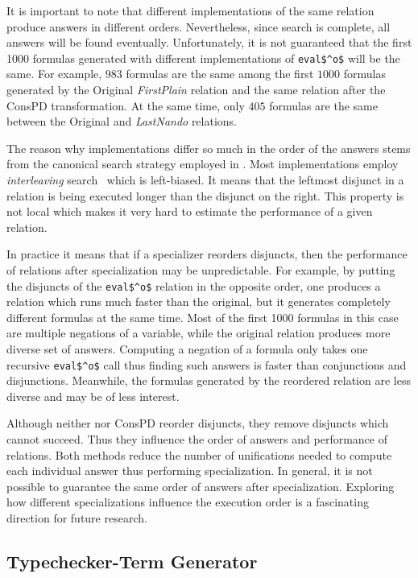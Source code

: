 It is important to note that different implementations of the same \mk relation produce answers in different orders.
Nevertheless, since \mk search is complete, all answers will be found eventually.
Unfortunately, it is not guaranteed that the first 1000 formulas generated with different implementations of \lstinline{eval$^o$} will be the same.
For example, $983$ formulas are the same among the first $1000$ formulas generated by the Original \emph{FirstPlain} relation and the same relation after the ConsPD transformation.
At the same time, only $405$ formulas are the same between the Original and \ecce \emph{LastNando} relations.

The reason why implementations differ so much in the order of the answers stems from the canonical search strategy employed in \mk.
Most \mk implementations employ \emph{interleaving} search~\cite{10.1145/1090189.1086390} which is left-biased.
It means that the leftmost disjunct in a relation is being executed longer than the disjunct on the right.
This property is not local which makes it very hard to estimate the performance of a given relation.

In practice it means that if a specializer reorders disjuncts, then the performance of relations after specialization may be unpredictable.
For example, by putting the disjuncts of the \lstinline{eval$^o$} relation in the opposite order, one produces a relation which runs much faster than the original, but it generates completely different formulas at the same time.
Most of the first 1000 formulas in this case are multiple negations of a variable, while the original relation produces more diverse set of answers.
Computing a negation of a formula only takes one recursive \lstinline{eval$^o$} call thus finding such answers is faster than conjunctions and disjunctions.
Meanwhile, the formulas generated by the reordered relation are less diverse and may be of less interest.

Although neither \ecce nor ConsPD reorder disjuncts, they remove disjuncts which cannot succeed.
Thus they influence the order of answers and performance of relations.
Both methods reduce the number of unifications needed to compute each individual answer thus performing specialization.
In general, it is not possible to guarantee the same order of answers after specialization.
Exploring how different specializations influence the execution order is a fascinating direction for future research.


\subsection{Typechecker-Term Generator}

